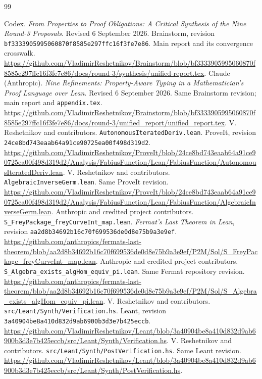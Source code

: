 \documentclass[11pt,a4paper]{article}
\newcommand{\code}[1]{\nolinkurl{#1}}
\theoremstyle{plain}
\theoremstyle{definition}
\theoremstyle{remark}
\begin{document}
\clearpage
\begin{thebibliography}{99}
\small\raggedright
{} Codex. \emph{From Properties to Proof Obligations: A Critical Synthesis of the Nine Round-3 Proposals}. Revised 6 September 2026. Brainstorm, revision \code{bf3333905995060870f8585e297ffc16f3fe7e86}. Main report and its convergence crosswalk. \url{https://github.com/VladimirReshetnikov/Brainstorm/blob/bf3333905995060870f8585e297ffc16f3fe7e86/docs/round-3/synthesis/unified-report.tex}.
 Claude (Anthropic). \emph{Nine Refinements: Property-Aware Typing in a Mathematician's Proof Language over Lean}. Revised 6 September 2026. Same Brainstorm revision; main report and \code{appendix.tex}. \url{https://github.com/VladimirReshetnikov/Brainstorm/blob/bf3333905995060870f8585e297ffc16f3fe7e86/docs/round-3/unified_report/unified_report.tex}.
 V. Reshetnikov and contributors. \code{AutonomousIteratedDeriv.lean}. ProveIt, revision \code{24ce8bd743eaab64a91ce90725ea00f498d319d2}. \url{https://github.com/VladimirReshetnikov/ProveIt/blob/24ce8bd743eaab64a91ce90725ea00f498d319d2/Analysis/FabiusFunction/Lean/FabiusFunction/AutonomousIteratedDeriv.lean}.
 V. Reshetnikov and contributors. \code{AlgebraicInverseGerm.lean}. Same ProveIt revision. \url{https://github.com/VladimirReshetnikov/ProveIt/blob/24ce8bd743eaab64a91ce90725ea00f498d319d2/Analysis/FabiusFunction/Lean/FabiusFunction/AlgebraicInverseGerm.lean}.
 Anthropic and credited project contributors. \code{S_FreyPackage_freyCurveInt_map.lean}. \emph{Fermat's Last Theorem in Lean}, revision \code{aa2d8b34692b16c70f699536de0d8e75b9a3e9ef}. \url{https://github.com/anthropics/fermats-last-theorem/blob/aa2d8b34692b16c70f699536de0d8e75b9a3e9ef/P2M/Sol/S_FreyPackage_freyCurveInt_map.lean}.
 Anthropic and credited project contributors. \code{S_Algebra_exists_algHom_equiv_pi.lean}. Same Fermat repository revision. \url{https://github.com/anthropics/fermats-last-theorem/blob/aa2d8b34692b16c70f699536de0d8e75b9a3e9ef/P2M/Sol/S_Algebra_exists_algHom_equiv_pi.lean}.
 V. Reshetnikov and contributors. \code{src/Leant/Synth/Verification.hs}. Leant, revision \code{3a40904be8a410d832d9ab6900b3d3e7b425eccb}. \url{https://github.com/VladimirReshetnikov/Leant/blob/3a40904be8a410d832d9ab6900b3d3e7b425eccb/src/Leant/Synth/Verification.hs}.
 V. Reshetnikov and contributors. \code{src/Leant/Synth/PostVerification.hs}. Same Leant revision. \url{https://github.com/VladimirReshetnikov/Leant/blob/3a40904be8a410d832d9ab6900b3d3e7b425eccb/src/Leant/Synth/PostVerification.hs}.

\end{thebibliography}
\end{document}
